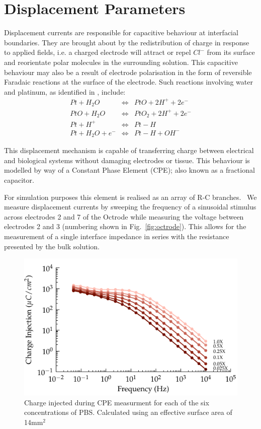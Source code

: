 \documentclass[journal, a4paper]{IEEEtran}
\begin{document}
\section{Displacement Parameters}
{
    \color{blue}
Displacement currents are responsible for capacitive behaviour at interfacial boundaries.
They are brought about by the redistribution of charge in response to applied fields, i.e. a charged electrode will attract or repel $Cl^{-}$ from its surface and reorientate polar molecules in the surrounding solution. This capacitive behaviour may also be a result of electrode polarisation in the form of reversible Faradaic reactions at the surface of the electrode.
Such reactions involving water and platinum, as identified in \cite{Horch2004,Mohtashami2011}, include:
    \begin{eqnarray}
        Pt + H_{2}O &\Leftrightarrow& PtO + 2 H^{+} + 2 e^{-}\\
        PtO + H_{2}O &\Leftrightarrow& PtO_{2} + 2 H^{+} + 2e^{-}\\
        Pt + H^{+} & \Leftrightarrow & Pt-H\\
        Pt + H_{2}O + e^{-} &\Leftrightarrow& Pt-H+OH^{-}
    \end{eqnarray}

This displacement mechanism is capable of transferring charge between electrical and biological systems without damaging electrodes or tissue. \cite{Horch2004}
This behaviour is modelled by way of a Constant Phase Element (CPE); also known as a fractional capacitor.
}
For simulation purposes this element is realised as an array of R-C branches.~\cite{ScottSingle2013,Morrison59,Elwakil10} We measure displacement currents by sweeping the frequency of a sinusoidal stimulus across electrodes 2 and 7 of the Octrode while measuring the voltage between electrodes 2 and 3 (numbering shown in Fig.~\ref{fig:octrode}). 
This allows for the measurement of a single interface impedance in series with the resistance presented by the bulk solution. 
\begin{figure}
    \begin{center}
        \includegraphics{graphics/chargeInjectionVsFrequency.pdf}
    \end{center}
    \caption{\color{blue} Charge injected during CPE measurment for each of the six concentrations of PBS. Calculated using an effective surface area of 14\thinspace mm$^{2}$}
    \label{fig:chargeInjectionVsFrequency}
\end{figure}
\end{document}
